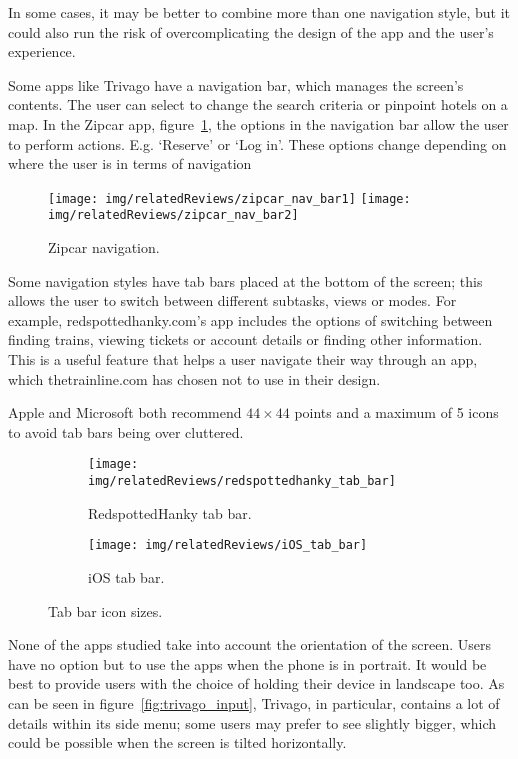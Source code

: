 In some cases, it may be better to combine more than one navigation style, but
it could also run the risk of overcomplicating the design of the app and the
user's experience.

Some apps like Trivago have a navigation bar, which manages the screen's
contents. The user can select to change the search criteria or pinpoint hotels
on a map. In the Zipcar app, figure~\ref{fig:zipcar_nav_bar}, the options in
the navigation bar allow the user to perform actions. E.g. `Reserve' or `Log
in'. These options change depending on where the user is in terms of navigation
\begin{figure}[htbp]
	\begin{center}
		\texttt{[image: img/relatedReviews/zipcar\_nav\_bar1]}
		\quad
		\texttt{[image: img/relatedReviews/zipcar\_nav\_bar2]}
	\end{center}
	\caption{Zipcar navigation\cite{ZipCarIOS}.}\label{fig:zipcar_nav_bar}
\end{figure}

Some navigation styles have tab bars placed at the bottom of the screen; this
allows the user to switch between different subtasks, views or modes. For
example, redspottedhanky.com's app includes the options of switching between
finding trains, viewing tickets or account details or finding other
information. This is a useful feature that helps a user navigate their way
through an app, which thetrainline.com has chosen not to use in their design.

Apple and Microsoft both recommend $44\times44$ points and a maximum of 5 icons
to avoid tab bars being over cluttered.
\begin{figure}[htbp]
	\centering
	\begin{subfigure}[b]{0.35\textwidth}
		\texttt{[image: img/relatedReviews/redspottedhanky\_tab\_bar]}
		\caption{RedspottedHanky tab bar. }\label{fig:redspottedhanky_tab_bar}
	\end{subfigure}%
	\qquad
	\begin{subfigure}[b]{0.4\textwidth}
		\texttt{[image: img/relatedReviews/iOS\_tab\_bar]}
		\caption{iOS tab bar.}\label{fig:iOS_tab_bar}
	\end{subfigure}
	\caption{Tab bar icon sizes.}
\end{figure}

None of the apps studied take into account the orientation of the screen. Users
have no option but to use the apps when the phone is in portrait. It would be
best to provide users with the choice of holding their device in landscape too.
As can be seen in figure~\ref{fig:trivago_input}, Trivago, in particular,
contains a lot of details within its side menu; some users may prefer to see
slightly bigger, which could be possible when the screen is tilted
horizontally.

